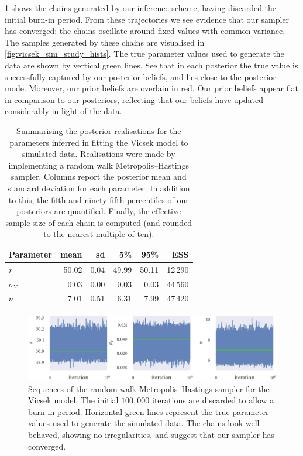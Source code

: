 \cref{fig:vicsek_sim_study_chains} shows the chains generated by our inference scheme,
having discarded the initial burn-in period. From these trajectories we see evidence that
our sampler has converged: the chains oscillate around fixed values with common
variance.  The samples generated by these chains are visualised in
\cref{fig:vicsek_sim_study_hists}.  The true parameter values used to generate the data
are shown by vertical green lines. See that in each posterior the true value is
successfully captured by our posterior beliefs, and lies close to the posterior mode.
Moreover, our prior beliefs are overlain in red. Our prior beliefs appear flat in
comparison to our posteriors, reflecting that our beliefs have updated considerably in
light of the data.
\begin{table}[tbp]
  \begin{tabular}{@{}lrrrrr@{}}
    \toprule
    Parameter    & mean  & sd   & 5\%   & 95\%  & ESS     \\
    \midrule
    $r$          & 50.02 & 0.04 & 49.99 & 50.11 & 12\,290 \\
    $\sigma_{Y}$ & 0.03  & 0.00 & 0.03  & 0.03  & 44\,560 \\
    $\nu$        & 7.01  & 0.51 & 6.31  & 7.99  & 47\,420 \\
    \bottomrule
  \end{tabular}
  \caption{Summarising the posterior realisations for the parameters inferred in fitting
    the Vicsek model to simulated data. Realisations were made by implementing a random
    walk Metropolis--Hastings sampler. Columns report the posterior mean and standard
    deviation for each parameter. In addition to this, the fifth and ninety-fifth
    percentiles of our posteriors are quantified. Finally, the effective sample size of each
    chain is computed (and rounded to the nearest multiple of ten).}
  \label{tab:vicsek_sim_study_summary}
\end{table}
\begin{figure}[tbp]
  \includegraphics{mh_r_trace.pdf}
  \caption{Sequences of the random walk Metropolis--Hastings sampler for the Vicsek model.
    The initial $100,000$ iterations are discarded to allow a burn-in period. Horizontal
    green lines represent the true parameter values used to generate the simulated data.
    The chains look well-behaved, showing no irregularities, and suggest that our
    sampler has converged.}
  \label{fig:vicsek_sim_study_chains}
\end{figure}
